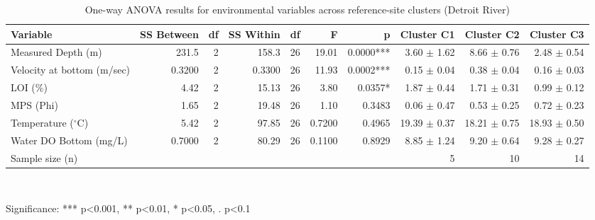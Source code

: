 \begin{table}[htbp]
  \centering
  \caption{One-way ANOVA results for environmental variables across reference-site clusters (Detroit River)}
  \label{tab:dr_02_taxa_assemblage_anova_env}
  \small
  \begin{tabular}{lrrrrrrrrr}
    \toprule
    Variable & SS Between & df & SS Within & df  & F & p & Cluster C1 & Cluster C2 & Cluster C3 \\
    \midrule
    Measured Depth (m) & 231.5 & 2 & 158.3 & 26 & 19.01 & 0.0000*** & 3.60 $\pm$ 1.62 & 8.66 $\pm$ 0.76 & 2.48 $\pm$ 0.54 \\
    Velocity  at bottom (m/sec) & 0.3200 & 2 & 0.3300 & 26 & 11.93 & 0.0002*** & 0.15 $\pm$ 0.04 & 0.38 $\pm$ 0.04 & 0.16 $\pm$ 0.03 \\
    LOI (\%) & 4.42 & 2 & 15.13 & 26 & 3.80 & 0.0357* & 1.87 $\pm$ 0.44 & 1.71 $\pm$ 0.31 & 0.99 $\pm$ 0.12 \\
    MPS (Phi) & 1.65 & 2 & 19.48 & 26 & 1.10 & 0.3483 & 0.06 $\pm$ 0.47 & 0.53 $\pm$ 0.25 & 0.72 $\pm$ 0.23 \\
    Temperature ($^{\circ}$C) & 5.42 & 2 & 97.85 & 26 & 0.7200 & 0.4965 & 19.39 $\pm$ 0.37 & 18.21 $\pm$ 0.75 & 18.93 $\pm$ 0.50 \\
    Water DO Bottom (mg/L) & 0.7000 & 2 & 80.29 & 26 & 0.1100 & 0.8929 & 8.85 $\pm$ 1.24 & 9.20 $\pm$ 0.64 & 9.28 $\pm$ 0.27 \\
    Sample size (n) &  &  &  &  &  &  & 5 & 10 & 14 \\
    \bottomrule
  \end{tabular}
  \\[4pt]
  \parbox{\textwidth}{\footnotesize Significance: *** p<0.001, ** p<0.01, * p<0.05, . p<0.1}
\end{table}
